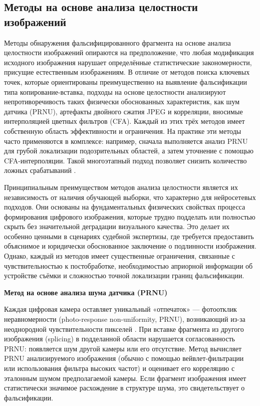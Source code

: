 \subsection{Методы на основе анализа целостности изображений}

Методы обнаружения фальсифицированного фрагмента на основе анализа целостности изображений опираются на предположение, что любая модификация исходного изображения нарушает определённые статистические закономерности, присущие естественным изображениям. В отличие от методов поиска ключевых точек, которые ориентированы преимущественно на выявление фальсификации типа копирование-вставка, подходы на основе целостности анализируют непротиворечивость таких физически обоснованных характеристик, как шум датчика (PRNU), артефакты двойного сжатия JPEG и корреляции, вносимые интерполяцией цветных фильтров (CFA). Каждый из этих трёх методов имеет собственную область эффективности и ограничения. На практике эти методы часто применяются в комплексе: например, сначала выполняется анализ PRNU для грубой локализации подозрительных областей, а затем уточнение с помощью CFA-интерполяции. Такой многоэтапный подход позволяет снизить количество ложных срабатываний \cite{2}.

Принципиальным преимуществом методов анализа целостности является их независимость от наличия обучающей выборки, что характерно для нейросетевых подходов. Они основаны на фундаментальных физических свойствах процесса формирования цифрового изображения, которые трудно подделать или полностью скрыть без значительной деградации визуального качества. Это делает их особенно ценными в сценариях судебной экспертизы, где требуется предоставить объяснимое и юридически обоснованное заключение о подлинности изображения. Однако, каждый из методов имеет существенные ограничения, связанные с чувствительностью к постобработке, необходимостью априорной информации об устройстве съёмки и сложностью точной локализации границ фальсификации.

\textbf{Метод на основе анализа шума датчика (PRNU)}

Каждая цифровая камера оставляет уникальный «отпечаток» --- фотоотклик неравномерности (photo-response non-uniformity, PRNU), возникающий из-за неоднородной чувствительности пикселей \cite{4}. При вставке фрагмента из другого изображения (splicing) в подделанной области нарушается согласованность PRNU: появляется шум другой камеры или его отсутствие. Метод вычисляет PRNU анализируемого изображения (обычно с помощью вейвлет-фильтрации или использования фильтра высоких частот) и оценивает его корреляцию с эталонным шумом предполагаемой камеры. Если фрагмент изображения имеет статистически значимое расхождение в структуре шума, это свидетельствует о фальсификации. 

